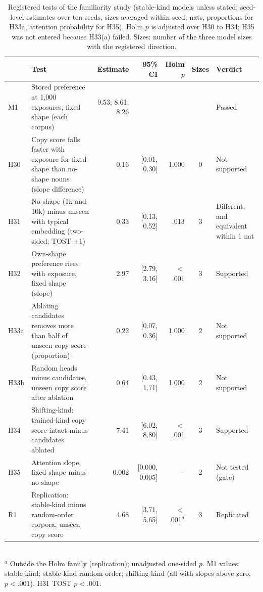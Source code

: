 \begin{table}[!htbp]
\centering\small

\begin{tabular}{@{}lp{}rrrcp{}@{}}
\toprule
& Test & Estimate & 95\% CI & Holm $p$ & Sizes & Verdict \\
\midrule
M1 & Stored preference at 1,000 exposures, fixed shape (each corpus) & 9.53; 8.61; 8.26 & & & & Passed \\
H30 & Copy score falls faster with exposure for fixed-shape than no-shape nouns (slope difference) & 0.16 & [0.01, 0.30] & 1.000 & 0 & Not supported \\
H31 & No shape (1k and 10k) minus unseen with typical embedding (two-sided; TOST $\pm$1) & 0.33 & [0.13, 0.52] & .013 & 3 & Different, and equivalent within 1 nat \\
H32 & Own-shape preference rises with exposure, fixed shape (slope) & 2.97 & [2.79, 3.16] & $<$.001 & 3 & Supported \\
H33a & Ablating candidates removes more than half of unseen copy score (proportion) & 0.22 & [0.07, 0.36] & 1.000 & 2 & Not supported \\
H33b & Random heads minus candidates, unseen copy score after ablation & 0.64 & [\textminus{}0.43, 1.71] & 1.000 & 2 & Not supported \\
H34 & Shifting-kind: trained-kind copy score intact minus candidates ablated & 7.41 & [6.02, 8.80] & $<$.001 & 3 & Supported \\
H35 & Attention slope, fixed shape minus no shape & 0.002 & [\textminus{}0.000, 0.005] & -- & 2 & Not tested (gate) \\
R1 & Replication: stable-kind minus random-order corpora, unseen copy score & 4.68 & [3.71, 5.65] & $<$.001$^a$ & 3 & Replicated \\
\bottomrule
\end{tabular}
\\[2pt]{\footnotesize $^a$ Outside the Holm family (replication); unadjusted one-sided $p$. M1 values: stable-kind; stable-kind random-order; shifting-kind (all with slopes above zero, $p<.001$). H31 TOST $p<.001$.}
\caption{Registered tests of the familiarity study (stable-kind models unless stated; seed-level estimates over ten seeds, sizes averaged within seed; nats, proportions for H33a, attention probability for H35). Holm $p$ is adjusted over H30 to H34; H35 was not entered because H33(a) failed. Sizes: number of the three model sizes with the registered direction.}
\label{tab:M1}
\end{table}

